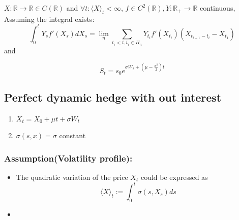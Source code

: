 \begin{corollary}
\end{corollary}

\begin{lemma}
	$X: \mathbb{R} \rightarrow \mathbb{R} \in C(\mathbb{R})$ and $\forall t: \langle X \rangle_t < \infty $, $f \in C^2(\mathbb{R}), Y: \mathbb{R}_+ \rightarrow \mathbb{R}$ continuous, Assuming the integral exists:
	\begin{equation*}
		\int_0^t Y_s f'(X_s)dX_s = \lim_n \sum_{t_i < t, t_i \in \Pi_n} Y_{t_i}f'(X_{t_i}) (X_{t_{i+1} - t_i} - X_{t_1})
	\end{equation*}
	and 
\end{lemma}


\begin{example}
\end{example}

\begin{example}	
\end{example}

\begin{example}
\begin{equation*}
	S_t = s_0 e^{\sigma W_t + (\mu - \frac{\sigma^2}{2})t}
\end{equation*}
\end{example}


\subsection{Perfect dynamic hedge with out interest}
\begin{example}	
\end{example}

\begin{example} \quad
\begin{enumerate}
	\item $X_t = X_0 + \mu t + \sigma W_t$
	\item $\sigma(s, x) = \sigma$ constant
\end{enumerate}
\end{example}

\subsubsection*{Assumption(Volatility profile):}
\begin{itemize}
	\item The quadratic variation of the price $X_t$ could be expressed as
\begin{equation*}
	\langle X \rangle_t := \int_0^t \sigma(s, X_s) ds
\end{equation*}
	\item 
\end{itemize}


